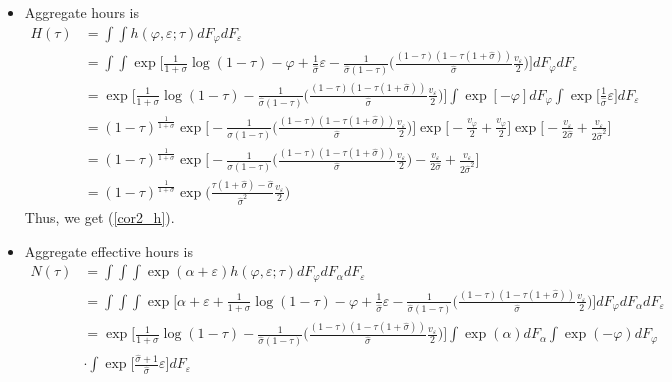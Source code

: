 \documentclass{article}
\begin{document}
\begin{itemize}
\item Aggregate hours is 
\begin{align*}
H(\tau) 
&= \int \int h(\varphi, \varepsilon; \tau) dF_\varphi dF_\varepsilon\\
&= \int \int \exp\Bigg[\frac{1}{1+\sigma}\log(1 - \tau) - \varphi + \frac{1}{\hat\sigma} \varepsilon - \frac{1}{\hat \sigma(1-\tau)} \Bigg( \frac{(1-\tau)(1-\tau(1+\hat\sigma))}{\hat \sigma}\frac{v_\varepsilon}{2} \Bigg)\Bigg] dF_\varphi dF_\varepsilon\\
&= \exp\Bigg[\frac{1}{1+\sigma}\log(1 - \tau) - \frac{1}{\hat \sigma(1-\tau)} \Bigg( \frac{(1-\tau)(1-\tau(1+\hat\sigma))}{\hat \sigma}\frac{v_\varepsilon}{2} \Bigg)\Bigg]
\int \exp[ - \varphi] dF_\varphi \int \exp\Bigg[ \frac{1}{\hat\sigma} \varepsilon \Bigg]dF_\varepsilon \\
&= (1 - \tau)^{ \frac{1}{1+\sigma}}  \exp\Bigg[- \frac{1}{\hat \sigma(1-\tau)} \Bigg( \frac{(1-\tau)(1-\tau(1+\hat\sigma))}{\hat \sigma}\frac{v_\varepsilon}{2} \Bigg)\Bigg]
\exp\Bigg[ - \frac{v_\varphi}{2} + \frac{v_\varphi}{2} \Bigg] \exp\Bigg[ -\frac{v_\varepsilon}{2\hat\sigma} +\frac{v_\varepsilon}{2\hat\sigma^2}  \Bigg]  \\
&= (1 - \tau)^{ \frac{1}{1+\sigma}} \exp\Bigg[ - \frac{1}{\hat \sigma(1-\tau)} \Bigg( \frac{(1-\tau)(1-\tau(1+\hat\sigma))}{\hat \sigma}\frac{v_\varepsilon}{2} \Bigg) -\frac{v_\varepsilon}{2\hat\sigma} +\frac{v_\varepsilon}{2\hat\sigma^2}  \Bigg]  \\
&= (1-\tau)^{\frac{1}{1+\sigma}} \exp\Bigg( \frac{\tau(1+\hat\sigma) - \hat \sigma}{\hat \sigma^2}\frac{v_\varepsilon}{2}\Bigg)
\end{align*}
Thus, we get (\ref{cor2_h}).
\item Aggregate effective hours is
\begin{align*}
N(\tau) 
&= \int \int \int \exp(\alpha + \varepsilon) h(\varphi, \varepsilon; \tau) dF_\varphi dF_\alpha dF_\varepsilon\\
&=\int \int \int \exp\Bigg[\alpha + \varepsilon +\frac{1}{1+\sigma}\log(1 - \tau) - \varphi + \frac{1}{\hat\sigma} \varepsilon - \frac{1}{\hat \sigma(1-\tau)} \Bigg( \frac{(1-\tau)(1-\tau(1+\hat\sigma))}{\hat \sigma}\frac{v_\varepsilon}{2} \Bigg)\Bigg] dF_\varphi dF_\alpha dF_\varepsilon\\
&= \exp\Bigg[\frac{1}{1+\sigma}\log(1 - \tau) - \frac{1}{\hat \sigma(1-\tau)} \Bigg( \frac{(1-\tau)(1-\tau(1+\hat\sigma))}{\hat \sigma}\frac{v_\varepsilon}{2} \Bigg)\Bigg] \int \exp(\alpha) dF_\alpha \int \exp(-\varphi) dF_\varphi \\ &\cdot \int \exp\Bigg[ \frac{\hat \sigma + 1}{\hat\sigma} \varepsilon \Bigg] dF_\varepsilon\\

\end{align*}
\end{itemize}
\end{document}
